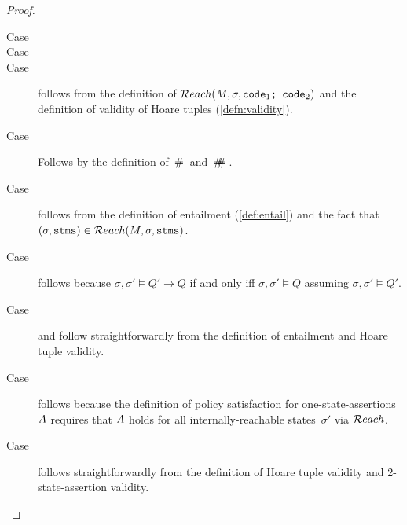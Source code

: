 \begin{proof}
\begin{description}
\item[Case]  

\item[Case]  
\item[Case]  follows from the definition of \linebreak
${\mathcal{R}each}(M,\sigma,{\textrm{\ttfamily{code$_1$; code$_2$}}})$ and the definition of validity of
Hoare tuples (\autoref{defn:validity}).
\item[Case]  
Follows by the definition of $\,\#\,$ and $\,\#\!\!\!\#\,$.
\item[Case]  follows from the definition of entailment
(\autoref{def:entail}) and the fact that\\ $(\sigma,{\textrm{\ttfamily{stms}}}) \in {\mathcal{R}each}(M,\sigma,{\textrm{\ttfamily{stms}}})$.
\item[Case]  follows because $\sigma,\sigma' \models Q' \rightarrow Q$ if and only iff $\sigma,\sigma' \models Q$ assuming $\sigma,\sigma' \models Q'$.
\item[Case]  and  follow straightforwardly from
the definition of entailment and Hoare tuple validity.
\item[Case]  follows because the definition of policy
satisfaction for one-state-assertions~$A$ requires that $A$ holds for all
internally-reachable states~$\sigma'$ via ${\mathcal{R}each}$.
\item[Case]  follows straightforwardly from the
definition of Hoare tuple validity and 2-state-assertion validity.
\end{description}
  \end{proof}




 


 


